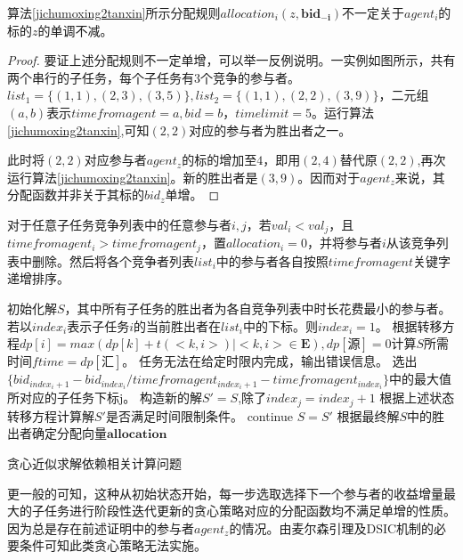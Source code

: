 \documentclass[promaster]{thesis-uestc}
\begin{document}
\begin{theorem}
    算法\ref{jichumoxing2tanxin}所示分配规则$allocation_i(z,\mathbf{bid_{-i}})$不一定关于$agent_i$的标的$z$的单调不减。
\end{theorem}

\begin{proof}
    要证上述分配规则不一定单增，可以举一反例说明。一实例如图所示，共有两个串行的子任务，每个子任务有$3$个竞争的参与者。$list_1=\{(1,1),(2,3),(3,5)\},list_2=\{(1,1),(2,2),(3,9)\}$，二元组$(a,b)$表示$timefromagent=a,bid=b$，$timelimit=5$。运行算法\ref{jichumoxing2tanxin},可知$(2,2)$对应的参与者为胜出者之一。

    此时将$(2,2)$对应参与者$agent_z$的标的增加至$4$，即用$(2,4)$替代原$(2,2)$,再次运行算法\ref{jichumoxing2tanxin}。新的胜出者是$(3,9)$。因而对于$agent_z$来说，其分配函数并非关于其标的$bid_z$单增。
\end{proof}

\begin{algorithm}[h]
    对于任意子任务竞争列表中的任意参与者$i,j$，若$val_i < val_j$，且$timefromagent_i > timefromagent_j$，置$allocation_i = 0$，并将参与者$i$从该竞争列表中删除。然后将各个竞争者列表$list_i$中的参与者各自按照$timefromagent$关键字递增排序。\;

    初始化解$S$，其中所有子任务的胜出者为各自竞争列表中时长花费最小的参与者。\;
    若以$index_i$表示子任务$i$的当前胜出者在$list_i$中的下标。则$index_i = 1$。\;
    根据转移方程$dp[i] = max(dp[k]+t(<k,i>)|<k,i> \in \mathbf{E}),dp[\text{源}] = 0$计算$S$所需时间$ftime = dp[\text{汇}]$。\;
    {
        任务无法在给定时限内完成，输出错误信息。\;
    }
    {
        选出$\{bid_{index_i+1}-bid_{index_i}/timefromagent_{index_i+1}-timefromagent_{index_i}\}$中的最大值所对应的子任务下标j。\;
        构造新的解$S' = S$,除了$index_j = index_j+1$\;
        根据上述状态转移方程计算解$S'$是否满足时间限制条件。\;
        {
            continue\;
        }
        $S = S'$\;
    } 
    根据最终解$S$中的胜出者确定分配向量$\mathbf{allocation}$\;
\caption{贪心近似求解依赖相关计算问题}
\label{jichumoxing2tanxin}
\end{algorithm}

更一般的可知，这种从初始状态开始，每一步选取选择下一个参与者的收益增量最大的子任务进行阶段性迭代更新的贪心策略对应的分配函数均不满足单增的性质。因为总是存在前述证明中的参与者$agent_z$的情况。由麦尔森引理及DSIC机制的必要条件可知此类贪心策略无法实施。
\end{document}
